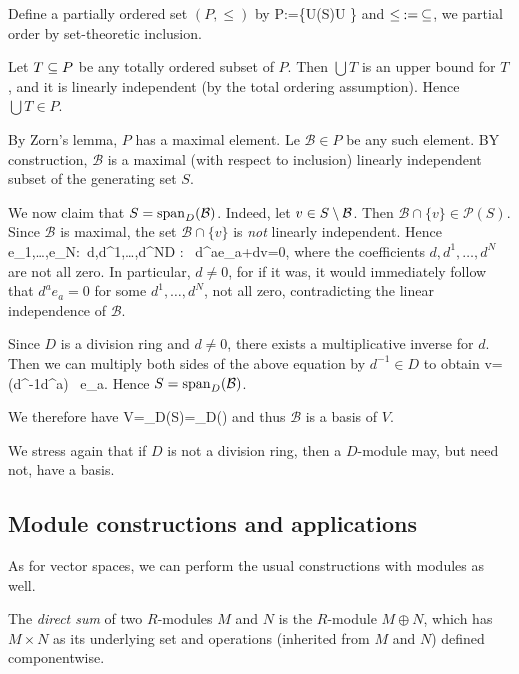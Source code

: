 \item Define a partially ordered set $(P,\leq)$ by
\bse
P:=\{U\in {}(S)\mid U \}
\ese
and $\leq\medspace :=\medspace \subseteq$, we partial order by set-theoretic inclusion.
\item Let $T\subseteq P$ be any totally ordered subset of $P$. Then $\bigcup T$ is an upper bound for $T$, and it is linearly independent (by the total ordering assumption). Hence $\bigcup T \in P$.

By Zorn's lemma, $P$ has a maximal element. Le $\mathcal{B}\in P$ be any such element. BY construction, $\mathcal{B}$ is a maximal (with respect to inclusion) linearly independent subset of the generating set $S$.

\item We now claim that $S=\operatorname{span}_D(\mathcal{B})$. Indeed, let $v\in S\setminus\mathcal{B}$. Then $\mathcal{B}\cap \{v\}\in \mathcal{P}(S)$. Since $\mathcal{B}$ is maximal, the set $\mathcal{B}\cap \{v\}$ is \emph{not} linearly independent. Hence
\bse
\exists\, e_1,\ldots,e_N\in{}:\exists\, d,d^1,\ldots,d^N\in D : \ d^ae_a+dv=0,
\ese
where the coefficients $d,d^1,\ldots,d^N$ are not all zero. In particular, $d\neq 0$, for if it was, it would immediately follow that $d^ae_a=0$ for some $d^1,\ldots,d^N$, not all zero, contradicting the linear independence of $\mathcal{B}$.

Since $D$ is a division ring and $d\neq 0$, there exists a multiplicative inverse for $d$. Then we can multiply both sides of the above equation by $d^{-1}\in D$ to obtain
\bse
v= (d^{-1}\cdot d^a) \, e_a.
\ese
Hence $S=\operatorname{span}_D(\mathcal{B})$.
\item We therefore have
\bse
V=\lspan_D(S)=\lspan_D()
\ese
and thus $\mathcal{B}$ is a basis of $V$. \qedhere
\een
\eq

We stress again that if $D$ is not a division ring, then a $D$-module may, but need not, have a basis.

\subsection{Module constructions and applications}

As for vector spaces, we can perform the usual constructions with modules as well.

\bd
The \emph{direct sum} of two $R$-modules $M$ and $N$ is the $R$-module $M\oplus N$, which has $M\times N$ as its underlying set and operations (inherited from $M$ and $N$) defined componentwise. 
\ed

